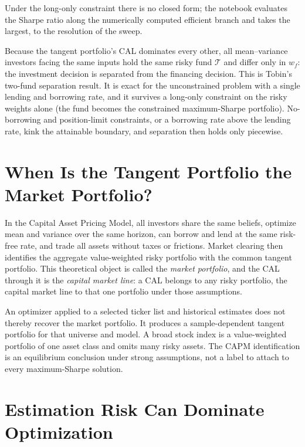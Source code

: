 \documentclass[11pt]{article}
\begin{document}
Under the long-only constraint there is no closed form; the notebook evaluates the Sharpe ratio along the numerically computed efficient branch and takes the largest, to the resolution of the sweep.

Because the tangent portfolio's CAL dominates every other, all mean--variance investors facing the same inputs hold the same risky fund $\mathcal T$ and differ only in $w_f$: the investment decision is separated from the financing decision. This is Tobin's two-fund separation result. It is exact for the unconstrained problem with a single lending and borrowing rate, and it survives a long-only constraint on the risky weights alone (the fund becomes the constrained maximum-Sharpe portfolio). No-borrowing and position-limit constraints, or a borrowing rate above the lending rate, kink the attainable boundary, and separation then holds only piecewise.

\section{When Is the Tangent Portfolio the Market Portfolio?}

In the Capital Asset Pricing Model, all investors share the same beliefs, optimize mean and variance over the same horizon, can borrow and lend at the same risk-free rate, and trade all assets without taxes or frictions. Market clearing then identifies the aggregate value-weighted risky portfolio with the common tangent portfolio. This theoretical object is called the \emph{market portfolio}, and the CAL through it is the \emph{capital market line}: a CAL belongs to any risky portfolio, the capital market line to that one portfolio under those assumptions.

An optimizer applied to a selected ticker list and historical estimates does not thereby recover the market portfolio. It produces a sample-dependent tangent portfolio for that universe and model. A broad stock index is a value-weighted portfolio of one asset class and omits many risky assets. The CAPM identification is an equilibrium conclusion under strong assumptions, not a label to attach to every maximum-Sharpe solution.

\section{Estimation Risk Can Dominate Optimization}
\end{document}
